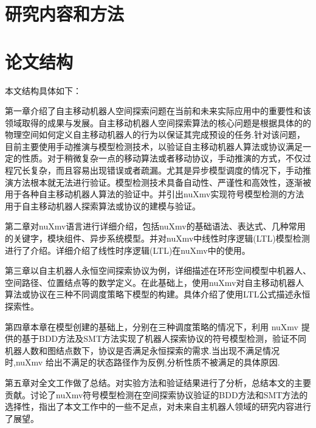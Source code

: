 \section{研究内容和方法}


\section{论文结构}
本文结构具体如下：

第一章介绍了自主移动机器人空间探索问题在当前和未来实际应用中的重要性和该领域取得的成果与发展。自主移动机器人空间探索算法的核心问题是根据具体的的物理空间如何定义自主移动机器人的行为以保证其完成预设的任务.针对该问题，目前主要使用手动推演与模型检测技术，以验证自主移动机器人算法或协议满足一定的性质。对于稍微复杂一点的移动算法或者移动协议，手动推演的方式，不仅过程冗长复杂，而且容易出现错误或者疏漏。尤其是异步模型调度的情况下，手动推演方法根本就无法进行验证。模型检测技术具备自动性、严谨性和高效性，逐渐被用于各种自主移动机器人算法的验证中。并引出nuXmv实现符号模型检测的方法用于自主移动机器人探索算法或协议的建模与验证。

第二章对nuXmv语言进行详细介绍，包括nuXmv的基础语法、表达式、几种常用的关键字，模块组件、异步系统模型。并对nuXmv中线性时序逻辑(LTL)模型检测进行了介绍。详细介绍了线性时序逻辑(LTL)在nuXmv中的使用。

第三章以自主机器人永恒空间探索协议为例，详细描述在环形空间模型中机器人、空间路径、位置结点等的数学定义。在此基础上，使用nuXmv对自主移动机器人算法或协议在三种不同调度策略下模型的构建。具体介绍了使用LTL公式描述永恒探索性。


第四章本章在模型创建的基础上，分别在三种调度策略的情况下，利用 nuXmv 提供的基于BDD方法及SMT方法实现了机器人探索协议的符号模型检测，验证不同机器人数和图结点数下，协议是否满足永恒探索的需求.当出现不满足情况时,nuXmv 给出不满足的状态路径作为反例,分析性质不被满足的具体原因.

第五章对全文工作做了总结。对实验方法和验证结果进行了分析，总结本文的主要贡献。讨论了nuXmv符号模型检测在空间探索协议验证的BDD方法和SMT方法的选择性，指出了本文工作中的一些不足点，对未来自主机器人领域的研究内容进行了展望。



